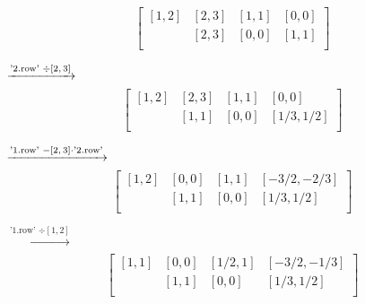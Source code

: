 \documentclass[german,10pt,xcolor=colortbl,compress]{beamer}
\begin{document}
\begin{frame}
\[
    \left[
    \begin{array}{cc|cc}
    [1,2]&[2,3]&[1,1]&[0,0]  \\

    [0,0]&[2,3]&[0,0]&[1,1]  \\
    \end{array}
    \right]
    \]

    \pause

    $\xrightarrow[\text{}]{\text{'2.row' $ \div  [2,3]$}}$
    \[
    \left[
    \begin{array}{cc|cc}
    [1,2]&[2,3]&[1,1]&[0,0]  \\

    [0,0]&[1,1]&[0,0]&[1/3,1/2]  \\
    \end{array}
    \right]
    \]

    \pause

    $\xrightarrow[\text{}]{\text{'1.row' $ - [2,3]\cdot$'2.row'}}$
    \[
    \left[
    \begin{array}{cc|cc}
    [1,2]&[0,0]&[1,1]&[-3/2,-2/3]  \\

    [0,0]&[1,1]&[0,0]&[1/3,1/2]  \\
    \end{array}
    \right]
    \]

    \pause

    $\xrightarrow[\text{}]{\text{'1.row' $\div  [1,2]$}}$
    \[
    \left[
    \begin{array}{cc|cc}
    [1,1]&[0,0]&[1/2,1]&[-3/2,-1/3]  \\

    [0,0]&[1,1]&[0,0]&[1/3,1/2]  \\
    \end{array}
    \right]
    \]


\end{frame}
\end{document}
